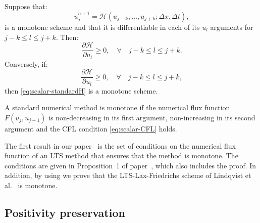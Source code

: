 \begin{lemma} \label{lemma:MS-conditionH}
Suppose that:
\begin{equation} \label{eq:scalar-standardH}
u_j^{n+1} = \mathcal{H} (u_{j-k}, \dots, u_{j+k}; \Delta x, \Delta t),
\end{equation}
is a monotone scheme and that it is differentiable in each of its $ u_l $ arguments for $ j-k \leq  l \leq j+k $. Then:
\begin{equation} 
\frac{\partial \mathcal{H}}{\partial u_l} \geq 0, \quad \forall \quad j-k \leq l \leq j+k.
\end{equation}
Conversely, if:
\begin{equation} \label{eq:MS-conditionH}
\frac{\partial \mathcal{H}}{\partial u_l} \geq 0, \quad \forall \quad j-k \leq l \leq j+k,
\end{equation}
then \eqref{eq:scalar-standardH} is a monotone scheme.
\end{lemma}
A standard numerical method is monotone if the numerical flux function $ F(u_j,u_{j+1}) $ is non-decreasing in its first argument, non-increasing in its second argument and the CFL condition \eqref{eq:scalar-CFL} holds. 

The first result in our paper~\cite{jp3} is the set of conditions on the numerical flux function of an LTS method that ensures that the method is monotone. The conditions are given in Proposition~1 of paper~\cite{jp3}, which also includes the proof. In addition, by using  we prove that the LTS-Lax-Friedrichs scheme of Lindqvist et al.~\cite{lin16} is monotone.

\subsection{Positivity preservation}

